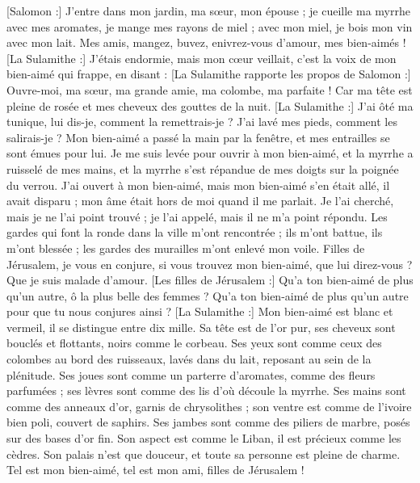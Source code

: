 \begin{multicols}{2}
\VerseOne{}[Salomon :] J’entre dans mon jardin, ma sœur, mon épouse ; je cueille ma myrrhe avec mes aromates, je mange mes rayons de miel ; avec mon miel, je bois mon vin avec mon lait. Mes amis, mangez, buvez, enivrez-vous d’amour, mes bien-aimés !
[La Sulamithe :] J'étais endormie, mais mon cœur veillait, c’est la voix de mon bien-aimé qui frappe, en disant : [La Sulamithe rapporte les propos de Salomon :] Ouvre-moi, ma sœur, ma grande amie, ma colombe, ma parfaite ! Car ma tête est pleine de rosée et mes cheveux des gouttes de la nuit.
[La Sulamithe :] J'ai ôté ma tunique, lui dis-je, comment la remettrais-je ? J'ai lavé mes pieds, comment les salirais-je ?
Mon bien-aimé a passé la main par la fenêtre, et mes entrailles se sont émues pour lui.
Je me suis levée pour ouvrir à mon bien-aimé, et la myrrhe a ruisselé de mes mains, et la myrrhe s’est répandue de mes doigts sur la poignée du verrou.
J'ai ouvert à mon bien-aimé, mais mon bien-aimé s'en était allé, il avait disparu ; mon âme était hors de moi quand il me parlait. Je l’ai cherché, mais je ne l’ai point trouvé ; je l'ai appelé, mais il ne m’a point répondu.
Les gardes qui font la ronde dans la ville m’ont rencontrée ; ils m’ont battue, ils m’ont blessée ; les gardes des murailles m'ont enlevé mon voile.
Filles de Jérusalem, je vous en conjure, si vous trouvez mon bien-aimé, que lui direz-vous ? Que je suis malade d’amour.
[Les filles de Jérusalem :] Qu'a ton bien-aimé de plus qu’un autre, ô la plus belle des femmes ? Qu'a ton bien-aimé de plus qu’un autre pour que tu nous conjures ainsi ?
[La Sulamithe :] Mon bien-aimé est blanc et vermeil, il se distingue entre dix mille.
Sa tête est de l’or pur, ses cheveux sont bouclés et flottants, noirs comme le corbeau.
Ses yeux sont comme ceux des colombes au bord des ruisseaux, lavés dans du lait, reposant au sein de la plénitude.
Ses joues sont comme un parterre d’aromates, comme des fleurs parfumées ; ses lèvres sont comme des lis d’où découle la myrrhe.
Ses mains sont comme des anneaux d'or, garnis de chrysolithes ; son ventre est comme de l’ivoire bien poli, couvert de saphirs.
Ses jambes sont comme des piliers de marbre, posés sur des bases d’or fin. Son aspect est comme le Liban, il est précieux comme les cèdres.
Son palais n'est que douceur, et toute sa personne est pleine de charme. Tel est mon bien-aimé, tel est mon ami, filles de Jérusalem !

\end{multicols}
